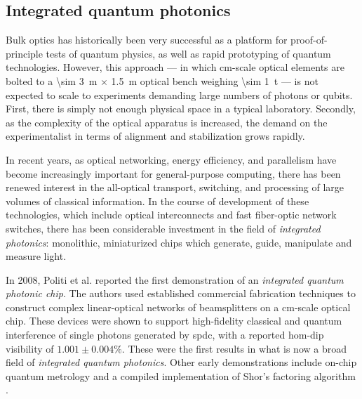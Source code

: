 \subsection{Integrated quantum photonics} 
\label{sec:integrated-quantum-photonics}
Bulk optics has historically been very successful as a platform for proof-of-principle tests of quantum physics, as well as rapid prototyping of quantum technologies. However, this approach --- in which \si{\centi\metre}-scale optical elements are bolted to a \SI{\sim 3}{\metre} $\times$ \SI{1.5}{\metre} optical bench weighing \SI{\sim 1}{\tonne} --- is not expected to scale to experiments demanding large numbers of photons or qubits. First, there is simply not enough physical space in a typical laboratory. Secondly, as the complexity of the optical apparatus is increased, the demand on the experimentalist in terms of alignment and stabilization grows rapidly.


In recent years, as optical networking, energy efficiency, and parallelism have become increasingly important for general-purpose computing, there has been renewed interest in 
the all-optical transport, switching, and processing of large volumes of classical information. In the course of development of these technologies, which include optical interconnects and fast fiber-optic network switches, there has been considerable investment in the field of \emph{integrated photonics}: monolithic, miniaturized chips which generate, guide, manipulate and measure light.

In 2008, Politi et al. reported \cite{Politi2008} the first demonstration of an \emph{integrated quantum photonic chip}. The authors used established commercial fabrication techniques to construct complex linear-optical networks of beamsplitters on a \si{\centi\metre}-scale optical chip. These devices were shown to support high-fidelity \cite{Laing2010a} classical and quantum interference of single photons generated by \gls{spdc}, with a reported \gls{hom}-dip visibility of $1.001\pm0.004\%$. These were the first results in what is now a broad field of \emph{integrated quantum photonics}.  Other early demonstrations include on-chip quantum metrology \cite{Matthews2009} and a compiled implementation of Shor's factoring algorithm \cite{Politi2009a}.

